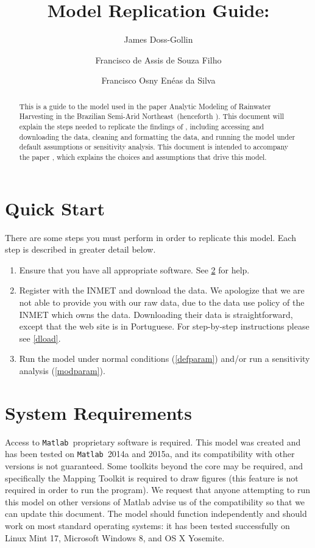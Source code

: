 \documentclass[11pt]{article} %
\title{Model Replication Guide: \\ \thepaper}
\author{James Doss-Gollin \and Francisco de Assis de Souza Filho \and Francisco Osny En\'{e}as da Silva}
\newcommand{\mtlb}{\texttt{Matlab\ }}
\newcommand{\thepaper}{Analytic Modeling of Rainwater Harvesting in the Brazilian Semi-Arid Northeast}
\begin{document}
\maketitle %

\begin{abstract} %
This is a guide to the model used in the paper \thepaper \ (henceforth \cite{dossgollin2015}).
This document will explain the steps needed to replicate the findings of \cite{dossgollin2015}, including accessing and downloading the data, cleaning and formatting the data, and running the model under default assumptions or sensitivity analysis.
This document is intended to accompany the paper \cite{dossgollin2015} , which explains the choices and assumptions that drive this model.
\end{abstract}


\clearpage
\tableofcontents
\clearpage %


\section{Quick Start}

There are some steps you must perform in order to replicate this model.
Each step is described in greater detail below.
\begin{enumerate}
\item Ensure that you have all appropriate software. See \cref{requirements} for help.
\item Register with the \ac{INMET} and download the data. We apologize that we are not able to provide you with our raw data, due to the data use policy of the \ac{INMET} which owns the data. Downloading their data is straightforward, except that the web site is in Portuguese. For step-by-step instructions please see \cref{dload}.
\item Run the model under normal conditions (\cref{defparam}) and/or run a sensitivity analysis (\cref{modparam}).
\end{enumerate}



\section{System Requirements} \label{requirements}

Access to \mtlb proprietary software is required.
This model was created and has been tested on \mtlb 2014a and 2015a, and its compatibility with other versions is not guaranteed.
Some toolkits beyond the core may be required, and specifically the Mapping Toolkit is required to draw figures (this feature is not required in order to run the program).
We request that anyone attempting to run this model on other versions of Matlab advise us of the compatibility so that we can update this document.
The model should function independently and should work on most standard operating systems: it has been tested successfully on Linux Mint 17, Microsoft Windows 8, and OS X Yosemite.
\end{document}
